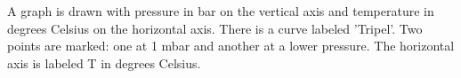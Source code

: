 A graph is drawn with pressure in bar on the vertical axis and temperature in degrees Celsius on the horizontal axis. There is a curve labeled 'Tripel'. Two points are marked: one at 1 mbar and another at a lower pressure. The horizontal axis is labeled T in degrees Celsius.